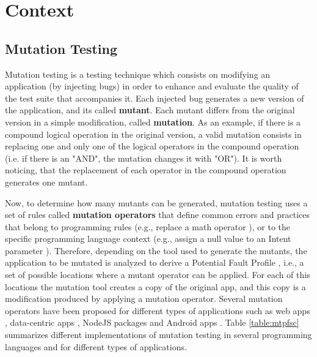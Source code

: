 
\chapter{Context} %

\label{Chapter2} %


\section{Mutation Testing}

Mutation testing is a testing technique which consists on modifying an application (by injecting bugs) in order to enhance and evaluate the quality of the test suite that accompanies it. Each injected bug generates a new version of the application, and its called \textbf{mutant}. Each mutant differs from the original version in a simple modification, called \textbf{mutation}. As an example, if there is a compound logical operation in the original version, a valid mutation consists in replacing one and only one of the logical operators in the compound operation (i.e. if there is an "AND", the mutation changes  it with "OR"). It is worth noticing, that the replacement of each operator in the compound operation generates one mutant.

Now, to determine how many mutants can be generated, mutation testing uses a set of rules called \textbf{mutation operators} that define common errors and practices that belong to programming rules (e.g., replace a math operator ), or to the specific programming language context (e.g., assign a null value to an Intent parameter ). Therefore, depending on the tool used to generate the mutants, the application to be mutated is analyzed to derive a Potential Fault Profile \cite{linares2017enabling,Moran:ICSE18}, i.e., a set of possible locations where a mutant operator can be applied. For each of this locations the mutation tool creates a copy of the original app, and this copy is a modification produced by applying a mutation operator. Several mutation operators have been proposed for different types of applications such as web apps \cite{praphamontripong2016experimental}, data-centric apps \cite{appelt2014automated}, NodeJS packages \cite{rodriguez2018mutode} and Android apps \cite{linares2017enabling}. Table \ref{table:mtpfsc} summarizes different implementations of mutation testing in several programming languages and for different types of applications.

